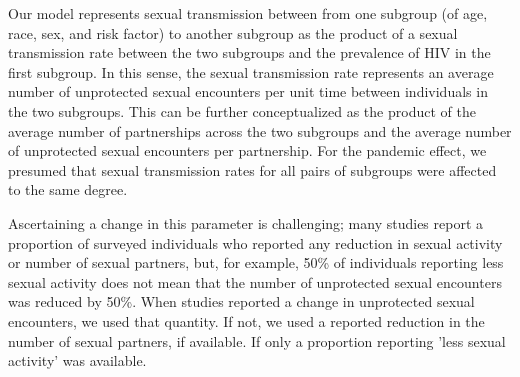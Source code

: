 \documentclass{article}
\begin{document}
Our model represents sexual transmission between from one subgroup (of age, race, sex, and risk factor) to another subgroup as the product of a sexual transmission rate between the two subgroups and the prevalence of HIV in the first subgroup. In this sense, the sexual transmission rate represents an average number of unprotected sexual encounters per unit time between individuals in the two subgroups. This can be further conceptualized as the product of the average number of partnerships across the two subgroups and the average number of unprotected sexual encounters per partnership. For the pandemic effect, we presumed that sexual transmission rates for all pairs of subgroups were affected to the same degree.

Ascertaining a change in this parameter is challenging; many studies report a proportion of surveyed individuals who reported any reduction in sexual activity or number of sexual partners, but, for example, 50\% of individuals reporting less sexual activity does not mean that the number of unprotected sexual encounters was reduced by 50\%. When studies reported a change in unprotected sexual encounters, we used that quantity. If not, we used a reported reduction in the number of sexual partners, if available. If only a proportion reporting 'less sexual activity' was available.
\end{document}
